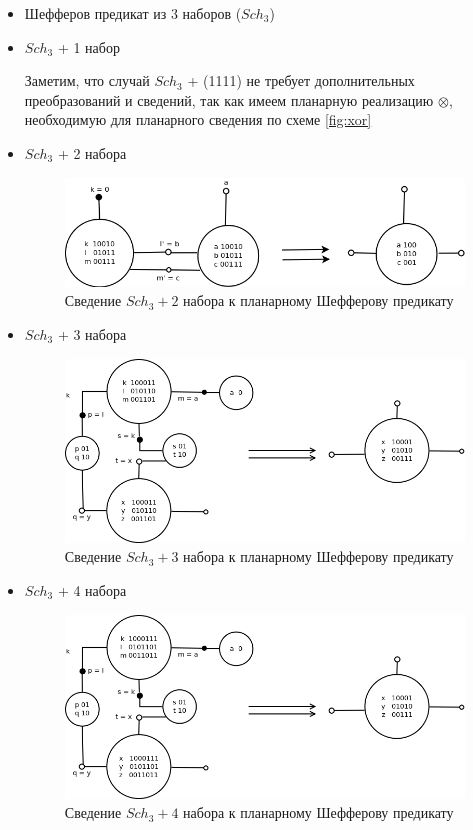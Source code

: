 \documentclass[12pt]{article}
\begin{document}
\begin{itemize}
\item{Шефферов предикат из 3 наборов ($Sch_3$)}
\item{$Sch_3$ + 1 набор}

Заметим, что случай $Sch_3$ + (1111) не требует дополнительных преобразований и сведений, так как имеем планарную реализацию
$\otimes$, необходимую для планарного сведения по схеме \ref{fig:xor}
\item{$Sch_3$ + 2 набора}
\begin{figure}[htb]
\centering
\includegraphics[width=1.0\textwidth]{3_2to3.png}
\caption{Сведение $Sch_3 + 2$ набора к планарному Шефферову предикату}
\label{fig:3_2to3}
\end{figure}
\item{$Sch_3$ + 3 набора}
\begin{figure}[htb]
\centering
\includegraphics[width=1.0\textwidth]{3_3to3_2.png}
\caption{Сведение $Sch_3 + 3$ набора к планарному Шефферову предикату}
\label{fig:3_3to3_2}
\end{figure}
\item{$Sch_3$ + 4 набора}
\begin{figure}[htb]
\centering
\includegraphics[width=1.0\textwidth]{3_4to3_2.png}
\caption{Сведение $Sch_3 + 4$ набора к планарному Шефферову предикату}
\label{fig:3_4to3_2}
\end{figure}
\end{itemize}
\end{document}
